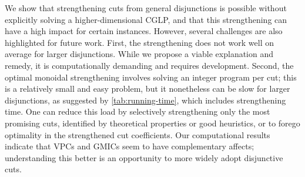 \documentclass[oribibl,envcountsame]{llncs}
\theoremstyle{remark}
\theoremstyle{definition}
\begin{document}
We show that strengthening cuts from general disjunctions is possible without explicitly solving a higher-dimensional CGLP,
and that this strengthening can have a high impact for certain instances.
However, several challenges are also highlighted for future work.
First, the strengthening does not work well on average for larger disjunctions.
While we propose a viable explanation and remedy, it is computationally demanding and requires development.
Second, the optimal monoidal strengthening involves solving an integer program per cut; this is a relatively small and easy problem, but it nonetheless can be slow
for larger disjunctions, as suggested by \cref{tab:running-time}, which includes strengthening time.
One can reduce this load by selectively strengthening only the most promising cuts, identified by theoretical properties or good heuristics,
or to forego optimality in the strengthened cut coefficients.
Our computational results indicate that VPCs and GMICs seem to have complementary affects; understanding this better is an opportunity to more widely adopt disjunctive cuts.

\ifspringer
    
\else
    
\fi



\newpage


\appendix
\end{document}
